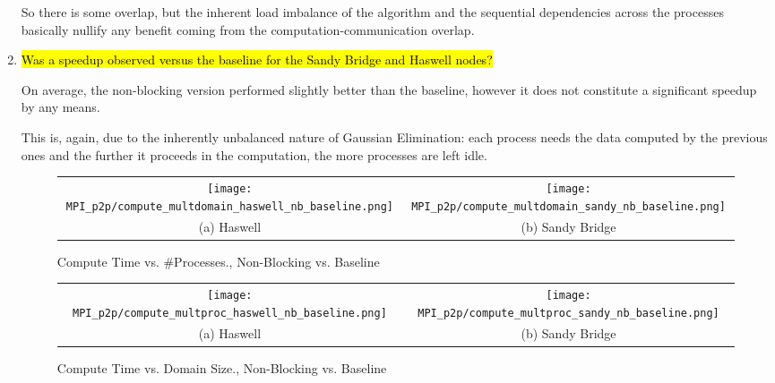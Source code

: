\begin{enumerate}
	So there is some overlap, but the inherent load imbalance of the algorithm and the sequential dependencies across the processes basically nullify any benefit coming from the computation-communication overlap.

	\item \hl{Was a speedup observed versus the baseline for the Sandy Bridge and Haswell nodes?}

	On average, the non-blocking version performed slightly better than the baseline, however it does not constitute a significant speedup by any means.

	This is, again, due to the inherently unbalanced nature of Gaussian Elimination: each process needs the data computed by the previous ones and the further it proceeds in the computation, the more processes are left idle.
	
	
	    	\begin{figure}[h] %
		\hspace*{-0.25\linewidth}\begin{tabular}{cc}
			\texttt{[image: MPI\_p2p/compute\_multdomain\_haswell\_nb\_baseline.png]} & \texttt{[image: MPI\_p2p/compute\_multdomain\_sandy\_nb\_baseline.png]} \\
			(a) Haswell &  (b) Sandy Bridge\\[6pt]
		\end{tabular}
		\caption{Compute Time vs. \#Processes., Non-Blocking vs. Baseline}
		\label{fig:compute_multdomain_nb_baseline}
	\end{figure}
	
	\begin{figure}[h] %
		\hspace*{-0.25\linewidth}\begin{tabular}{cc}
			\texttt{[image: MPI\_p2p/compute\_multproc\_haswell\_nb\_baseline.png]} & \texttt{[image: MPI\_p2p/compute\_multproc\_sandy\_nb\_baseline.png]} \\
			(a) Haswell &  (b) Sandy Bridge\\[6pt]
		\end{tabular}
		\caption{Compute Time vs. Domain Size., Non-Blocking vs. Baseline}
		\label{fig:compute_multproc_nb_baseline}
	\end{figure}
	

\end{enumerate}
